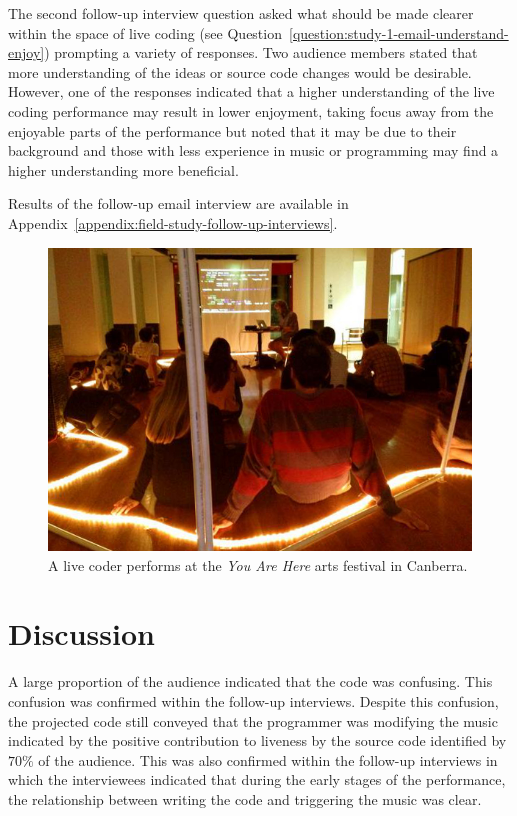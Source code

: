 The second follow-up interview question asked what should be made clearer within the space of live coding (see Question~\ref{question:study-1-email-understand-enjoy}) prompting a variety of responses. Two audience members stated that more understanding of the ideas or source code changes would be desirable. However, one of the responses indicated that a higher understanding of the live coding performance may result in lower enjoyment, taking focus away from the enjoyable parts of the performance but noted that it may be due to their background and those with less experience in music or programming may find a higher understanding more beneficial.

Results of the follow-up email interview are available in Appendix~\ref{appendix:field-study-follow-up-interviews}.

\begin{figure}
\centering
\includegraphics[width=\textwidth]{../images/study-1-you-are-here.jpg}
\caption[\textit{You Are Here} live coding performance]{A live coder performs at the \textit{You Are Here} arts festival in Canberra.}
\label{fig:you-are-here-performance}
\end{figure}

\section{Discussion}

A large proportion of the audience indicated that the code was confusing. This confusion was confirmed within the follow-up interviews. Despite this confusion, the projected code still conveyed that the programmer was modifying the music indicated by the positive contribution to liveness by the source code identified by $70\%$ of the audience. This was also confirmed within the follow-up interviews in which the interviewees indicated that during the early stages of the performance, the relationship between writing the code and triggering the music was clear.

